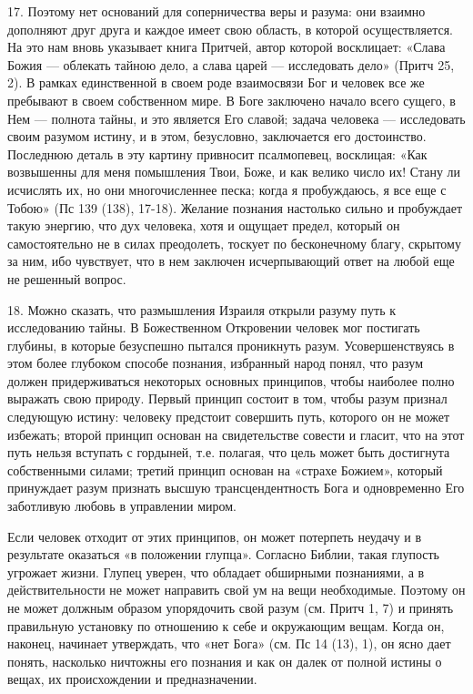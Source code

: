 \documentclass[a5paper,10pt]{article}
\begin{document}
17. Поэтому нет оснований для соперничества веры и разума: они взаимно
дополняют друг друга и каждое имеет свою область, в которой осуществляется. На
это нам вновь указывает книга Притчей, автор которой восклицает: «Слава Божия —
облекать тайною дело, а слава царей — исследовать дело» (Притч 25, 2). В рамках
единственной в своем роде взаимосвязи Бог и человек все же пребывают в своем
собственном мире. В Боге заключено начало всего сущего, в Нем — полнота тайны,
и это является Его славой; задача человека — исследовать своим разумом истину,
и в этом, безусловно, заключается его достоинство. Последнюю деталь в эту
картину привносит псалмопевец, восклицая: «Как возвышенны для меня помышления
Твои, Боже, и как велико число их! Стану ли исчислять их, но они многочисленнее
песка; когда я пробуждаюсь, я все еще с Тобою» (Пс 139 (138), 17-18). Желание
познания настолько сильно и пробуждает такую энергию, что дух человека, хотя и
ощущает предел, который он самостоятельно не в силах преодолеть, тоскует по
бесконечному благу, скрытому за ним, ибо чувствует, что в нем заключен
исчерпывающий ответ на любой еще не решенный вопрос.

18. Можно сказать, что размышления Израиля открыли разуму путь к исследованию
тайны. В Божественном Откровении человек мог постигать глубины, в которые
безуспешно пытался проникнуть разум. Усовершенствуясь в этом более глубоком
способе познания, избранный народ понял, что разум должен придерживаться
некоторых основных принципов, чтобы наиболее полно выражать свою природу.
Первый принцип состоит в том, чтобы разум признал следующую истину: человеку
предстоит совершить путь, которого он не может избежать; второй принцип основан
на свидетельстве совести и гласит, что на этот путь нельзя вступать с гордыней,
т.е. полагая, что цель может быть достигнута собственными силами; третий
принцип основан на «страхе Божием», который принуждает разум признать высшую
трансцендентность Бога и одновременно Его заботливую любовь в управлении миром.

Если человек отходит от этих принципов, он может потерпеть неудачу и в
результате оказаться «в положении глупца». Согласно Библии, такая глупость
угрожает жизни. Глупец уверен, что обладает обширными познаниями, а в
действительности не может направить свой ум на вещи необходимые. Поэтому он не
может должным образом упорядочить свой разум (см. Притч 1, 7) и принять
правильную установку по отношению к себе и окружающим вещам. Когда он, наконец,
начинает утверждать, что «нет Бога» (см. Пс 14 (13), 1), он ясно дает понять,
насколько ничтожны его познания и как он далек от полной истины о вещах, их
происхождении и предназначении.
\end{document}
